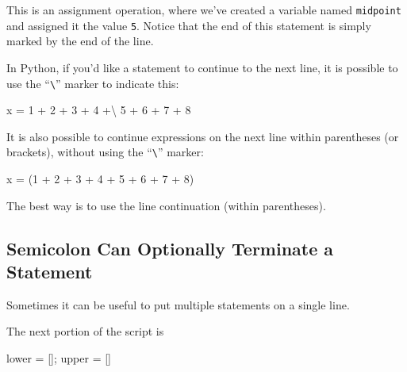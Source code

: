 \documentclass[
  letterpaper,
  DIV=11,
  numbers=noendperiod]{scrartcl}
\newenvironment{Shaded}{\begin{snugshade}}{\end{snugshade}}
\newcommand{\DecValTok}[1]{\textcolor[rgb]{0.68,0.00,0.00}{#1}}
\newcommand{\NormalTok}[1]{\textcolor[rgb]{0.00,0.23,0.31}{#1}}
\newcommand{\OperatorTok}[1]{\textcolor[rgb]{0.37,0.37,0.37}{#1}}
\begin{document}
This is an assignment operation, where we've created a variable named
\texttt{midpoint} and assigned it the value \texttt{5}. Notice that the
end of this statement is simply marked by the end of the line.

In Python, if you'd like a statement to continue to the next line, it is
possible to use the ``\texttt{\textbackslash{}}'' marker to indicate
this:

\begin{Shaded}
\begin{Highlighting}[]
\NormalTok{x }\OperatorTok{=} \DecValTok{1} \OperatorTok{+} \DecValTok{2} \OperatorTok{+} \DecValTok{3} \OperatorTok{+} \DecValTok{4} \OperatorTok{+\textbackslash{}}
    \DecValTok{5} \OperatorTok{+} \DecValTok{6} \OperatorTok{+} \DecValTok{7} \OperatorTok{+} \DecValTok{8}
\end{Highlighting}
\end{Shaded}

It is also possible to continue expressions on the next line within
parentheses (or brackets), without using the
``\texttt{\textbackslash{}}'' marker:

\begin{Shaded}
\begin{Highlighting}[]
\NormalTok{x }\OperatorTok{=}\NormalTok{ (}\DecValTok{1} \OperatorTok{+} \DecValTok{2} \OperatorTok{+} \DecValTok{3} \OperatorTok{+} \DecValTok{4} \OperatorTok{+}
     \DecValTok{5} \OperatorTok{+} \DecValTok{6} \OperatorTok{+} \DecValTok{7} \OperatorTok{+} \DecValTok{8}\NormalTok{)}
\end{Highlighting}
\end{Shaded}

The best way is to use the line continuation (within parentheses).

\hypertarget{semicolon-can-optionally-terminate-a-statement}{%
\subsection{Semicolon Can Optionally Terminate a
Statement}\label{semicolon-can-optionally-terminate-a-statement}}

Sometimes it can be useful to put multiple statements on a single line.

The next portion of the script is

\begin{Shaded}
\begin{Highlighting}[]
\NormalTok{lower }\OperatorTok{=}\NormalTok{ []}\OperatorTok{;}\NormalTok{ upper }\OperatorTok{=}\NormalTok{ []}
\end{Highlighting}
\end{Shaded}
\end{document}
